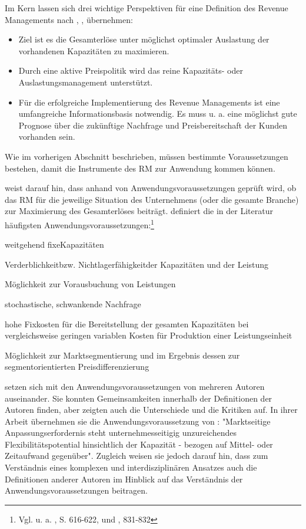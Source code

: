 Im Kern lassen sich drei wichtige Perspektiven für eine Definition des Revenue Managements nach \cite{Petrick:2009aa}, \cite{stuhlmann2000kapazitatsgestaltung},  \cite{corsten1999yield} übernehmen:
\begin{itemize}
	\item Ziel ist es die Gesamterlöse unter möglichst optimaler Auslastung der vorhandenen Kapazitäten zu maximieren.
	\item Durch eine aktive Preispolitik wird das reine Kapazitäts- oder Auslastungsmanagement unterstützt.
	\item Für die erfolgreiche Implementierung des Revenue Managements ist eine umfangreiche Informationsbasis notwendig. Es muss u. a. eine möglichst gute Prognose über die zukünftige Nachfrage und Preisbereitschaft der Kunden vorhanden sein.
\end{itemize}
\vspace{0.2cm}
Wie im vorherigen Abschnitt beschrieben, müssen bestimmte Voraussetzungen bestehen, damit die Instrumente des RM zur Anwendung kommen können.

\cite{Petrick:2009aa} weist da\-rauf hin, dass anhand von Anwendungsvoraussetzungen geprüft wird, ob das RM für die jeweilige Situation des Unternehmens (oder die gesamte Branche) zur Maximierung des Gesamterlöses beiträgt. \cite{kimes1989yield} definiert die in der Literatur häufigsten Anwendungsvoraussetzungen:\footnote{Vgl. u. a. \cite{friege1996yield}, S. 616-622, und \cite{weatherford1992taxonomy}, 831-832}
\begin{itemize*}
	\item \glqq weitgehend fixe\grqq\;Kapazitäten
	\item \glqq Verderblichkeit\grqq\;bzw. \glqq Nichtlagerfähigkeit\grqq\;der Kapazitäten und der Leistung
	\item Möglichkeit zur Vorausbuchung von Leistungen
	\item stochastische, schwankende Nachfrage
	\item hohe Fixkosten für die Bereitstellung der gesamten Kapazitäten bei vergleichsweise geringen variablen Kosten für Produktion einer Leistungseinheit
	\item Möglichkeit zur Marktsegmentierung und im Ergebnis dessen zur segmentorientierten Preisdifferenzierung
\end{itemize*}
\vspace{0.2cm}
\cite{Klein:2008aa} setzen sich mit den Anwendungsvoraussetzungen von mehreren Autoren auseinander. Sie konnten Gemeinsamkeiten innerhalb der Definitionen der Autoren finden, aber zeigten auch die Unterschiede und die Kritiken auf. In ihrer Arbeit übernehmen sie die Anwendungsvoraussetzung von \cite{corsten1998yield}: "Marktseitige Anpassungserfordernis steht unternehmesseitigig unzureichendes Flexibilitätspotential hinsichtlich der Kapazität - bezogen auf Mittel- oder Zeitaufwand gegenüber". Zugleich weisen sie jedoch darauf hin, dass zum Verständnis eines komplexen und interdisziplinären Ansatzes auch die Definitionen anderer Autoren im Hinblick auf das Verständnis der Anwendungsvoraussetzungen beitragen.\\

